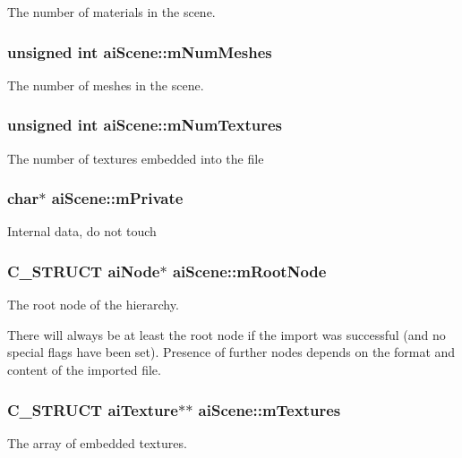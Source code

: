 The number of materials in the scene. \hypertarget{structai_scene_a1a6c1abca994c54381a28cc151e5fa4f}{
\subsubsection[{m\-Num\-Meshes}]{\setlength{\rightskip}{0pt plus 5cm}unsigned int ai\-Scene\-::m\-Num\-Meshes}}\label{structai_scene_a1a6c1abca994c54381a28cc151e5fa4f}
The number of meshes in the scene. \hypertarget{structai_scene_a0d61a5439edd7223097b48aea57c47dd}{
\subsubsection[{m\-Num\-Textures}]{\setlength{\rightskip}{0pt plus 5cm}unsigned int ai\-Scene\-::m\-Num\-Textures}}\label{structai_scene_a0d61a5439edd7223097b48aea57c47dd}
The number of textures embedded into the file \hypertarget{structai_scene_adc5fcf5c4ef86a45f721560d6c1a4923}{
\subsubsection[{m\-Private}]{\setlength{\rightskip}{0pt plus 5cm}char$\ast$ ai\-Scene\-::m\-Private}}\label{structai_scene_adc5fcf5c4ef86a45f721560d6c1a4923}
Internal data, do not touch \hypertarget{structai_scene_ad0e9a7e68f2ed6b3120a7c19ef20307a}{
\subsubsection[{m\-Root\-Node}]{\setlength{\rightskip}{0pt plus 5cm}C\-\_\-\-S\-T\-R\-U\-C\-T {\bf ai\-Node}$\ast$ ai\-Scene\-::m\-Root\-Node}}\label{structai_scene_ad0e9a7e68f2ed6b3120a7c19ef20307a}
The root node of the hierarchy.

There will always be at least the root node if the import was successful (and no special flags have been set). Presence of further nodes depends on the format and content of the imported file. \hypertarget{structai_scene_a0fd0d29fbc439e3715b4975ccb68d2d3}{
\subsubsection[{m\-Textures}]{\setlength{\rightskip}{0pt plus 5cm}C\-\_\-\-S\-T\-R\-U\-C\-T {\bf ai\-Texture}$\ast$$\ast$ ai\-Scene\-::m\-Textures}}\label{structai_scene_a0fd0d29fbc439e3715b4975ccb68d2d3}
The array of embedded textures.

